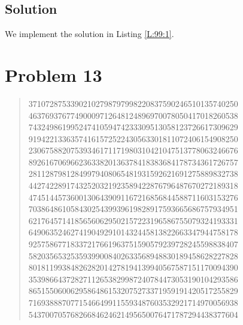 \documentclass[oneside,12pt]{book}   	%
\newcounter{ex}
\theoremstyle{definition}
\begin{document}
\begin{spacing}{1.618}
		\section{Solution}
		
			We implement the solution in Listing \ref{L:99:1}. 
			
			

\appendix

	\chapter{Problem 13}\label{A:P:13}
	
		\begin{quote}
37107287533902102798797998220837590246510135740250 \\
46376937677490009712648124896970078050417018260538 \\
74324986199524741059474233309513058123726617309629 \\
91942213363574161572522430563301811072406154908250 \\
23067588207539346171171980310421047513778063246676 \\
89261670696623633820136378418383684178734361726757 \\
28112879812849979408065481931592621691275889832738 \\
44274228917432520321923589422876796487670272189318 \\
47451445736001306439091167216856844588711603153276 \\
70386486105843025439939619828917593665686757934951 \\
62176457141856560629502157223196586755079324193331 \\
64906352462741904929101432445813822663347944758178 \\
92575867718337217661963751590579239728245598838407 \\
58203565325359399008402633568948830189458628227828 \\
80181199384826282014278194139940567587151170094390 \\
35398664372827112653829987240784473053190104293586 \\
86515506006295864861532075273371959191420517255829 \\
71693888707715466499115593487603532921714970056938 \\
54370070576826684624621495650076471787294438377604 \\

\end{quote}
\end{spacing}
\end{document}
